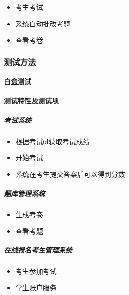 \documentclass[hyperref, a4paper]{ctexart}
\providecommand{\tightlist}{%
  \setlength{\itemsep}{0pt}\setlength{\parskip}{0pt}}
\let\oldparagraph\paragraph
\renewcommand{\paragraph}[1]{\oldparagraph{#1}\mbox{}}
\let\oldsubparagraph\subparagraph
\renewcommand{\subparagraph}[1]{\oldsubparagraph{#1}\mbox{}}
\begin{document}
\begin{itemize}
\tightlist
\item
  考生考试
\item
  系统自动批改考题
\item
  查看考卷
\end{itemize}

\hypertarget{ux6d4bux8bd5ux65b9ux6cd5}{%
\subsubsection{测试方法}\label{ux6d4bux8bd5ux65b9ux6cd5}}

\hypertarget{ux767dux76d2ux6d4bux8bd5}{%
\paragraph{白盒测试}\label{ux767dux76d2ux6d4bux8bd5}}

\hypertarget{ux6d4bux8bd5ux7279ux6027ux53caux6d4bux8bd5ux9879}{%
\paragraph{测试特性及测试项}\label{ux6d4bux8bd5ux7279ux6027ux53caux6d4bux8bd5ux9879}}

\hypertarget{ux8003ux8bd5ux7cfbux7edf-2}{%
\subparagraph{考试系统}\label{ux8003ux8bd5ux7cfbux7edf-2}}

\begin{itemize}
\tightlist
\item
  根据考试id获取考试成绩
\item
  开始考试
\item
  系统在考生提交答案后可以得到分数
\end{itemize}

\hypertarget{ux9898ux5e93ux7ba1ux7406ux7cfbux7edf-1}{%
\subparagraph{题库管理系统}\label{ux9898ux5e93ux7ba1ux7406ux7cfbux7edf-1}}

\begin{itemize}
\tightlist
\item
  生成考卷
\item
  查看考题
\end{itemize}

\hypertarget{ux5728ux7ebfux62a5ux540dux8003ux751fux7ba1ux7406ux7cfbux7edf}{%
\subparagraph{在线报名考生管理系统}\label{ux5728ux7ebfux62a5ux540dux8003ux751fux7ba1ux7406ux7cfbux7edf}}

\begin{itemize}
\tightlist
\item
  考生参加考试
\item
  学生账户服务
\end{itemize}
\end{document}
